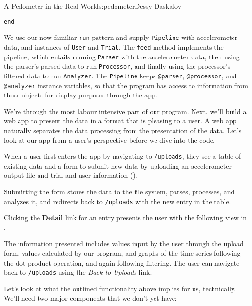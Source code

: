 \begin{aosachapter}{A Pedometer in the Real World}{s:pedometer}{Dessy Daskalov}
\begin{verbatim}
end
\end{verbatim}

We use our now-familiar \texttt{run} pattern and supply
\texttt{Pipeline} with accelerometer data, and instances of
\texttt{User} and \texttt{Trial}. The \texttt{feed} method implements
the pipeline, which entails running \texttt{Parser} with the
accelerometer data, then using the parser's parsed data to run
\texttt{Processor}, and finally using the processor's filtered data to
run \texttt{Analyzer}. The \texttt{Pipeline} keeps \texttt{@parser},
\texttt{@processor}, and \texttt{@analyzer} instance variables, so that
the program has access to information from those objects for display
purposes through the app.

\label{adding-a-friendly-interface}

We're through the most labour intensive part of our program. Next, we'll
build a web app to present the data in a format that is pleasing to a
user. A web app naturally separates the data processing from the
presentation of the data. Let's look at our app from a user's
perspective before we dive into the code.

\label{a-user-scenario}

When a user first enters the app by navigating to \texttt{/uploads},
they see a table of existing data and a form to submit new data by
uploading an accelerometer output file and trial and user information
().


Submitting the form stores the data to the file system, parses,
processes, and analyzes it, and redirects back to \texttt{/uploads} with
the new entry in the table.

Clicking the \textbf{Detail} link for an entry presents the user with
the following view in .


The information presented includes values input by the user through the
upload form, values calculated by our program, and graphs of the time
series following the dot product operation, and again following
filtering. The user can navigate back to \texttt{/uploads} using the
\emph{Back to Uploads} link.

Let's look at what the outlined functionality above implies for us,
technically. We'll need two major components that we don't yet have:


\end{aosachapter}
